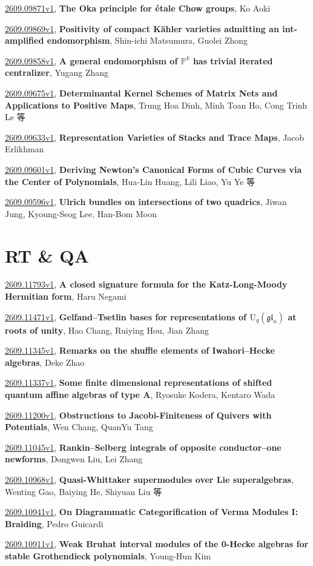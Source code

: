 \documentclass[9pt, a4paper]{article}
\theoremstyle{plain}
\theoremstyle{definition}
\theoremstyle{remark}
\newcommand{\arxiv}[3]{\href{https://arxiv.org/abs/#1}{#1}, \textbf{\textcolor{arxivblue}{#2}}, #3}
\begin{document}
\arxiv{2609.09871v1}{The Oka principle for étale Chow groups}{Ko Aoki}

\arxiv{2609.09869v1}{Positivity of compact Kähler varieties admitting an int-amplified endomorphism}{Shin-ichi Matsumura, Guolei Zhong}

\arxiv{2609.09858v1}{A general endomorphism of $\mathbb{P}^k$ has trivial iterated centralizer}{Yugang Zhang}

\arxiv{2609.09675v1}{Determinantal Kernel Schemes of Matrix Nets and Applications to Positive Maps}{Trung Hoa Dinh, Minh Toan Ho, Cong Trinh Le 等}

\arxiv{2609.09633v1}{Representation Varieties of Stacks and Trace Maps}{Jacob Erlikhman}

\arxiv{2609.09601v1}{Deriving Newton's Canonical Forms of Cubic Curves via the Center of Polynomials}{Hua-Lin Huang, Lili Liao, Yu Ye 等}

\arxiv{2609.09596v1}{Ulrich bundles on intersections of two quadrics}{Jiwan Jung, Kyoung-Seog Lee, Han-Bom Moon}


\section{RT \& QA}
\arxiv{2609.11793v1}{A closed signature formula for the Katz-Long-Moody Hermitian form}{Haru Negami}

\arxiv{2609.11471v1}{Gelfand--Tsetlin bases for representations of $\mathrm U_{q}(\mathfrak{gl}_n)$ at roots of unity}{Hao Chang, Ruiying Hou, Jian Zhang}

\arxiv{2609.11345v1}{Remarks on the shuffle elements of Iwahori--Hecke algebras}{Deke Zhao}

\arxiv{2609.11337v1}{Some finite dimensional representations of shifted quantum affine algebras of type A}{Ryosuke Kodera, Kentaro Wada}

\arxiv{2609.11200v1}{Obstructions to Jacobi-Finiteness of Quivers with Potentials}{Wen Chang, QuanYu Tang}

\arxiv{2609.11045v1}{Rankin--Selberg integrals of opposite conductor--one newforms}{Dongwen Liu, Lei Zhang}

\arxiv{2609.10968v1}{Quasi-Whittaker supermodules over Lie superalgebras}{Wenting Gao, Baiying He, Shiyuan Liu 等}

\arxiv{2609.10941v1}{On Diagrammatic Categorification of Verma Modules I: Braiding}{Pedro Guicardi}

\arxiv{2609.10911v1}{Weak Bruhat interval modules of the 0-Hecke algebras for stable Grothendieck polynomials}{Young-Hun Kim}
\end{document}
